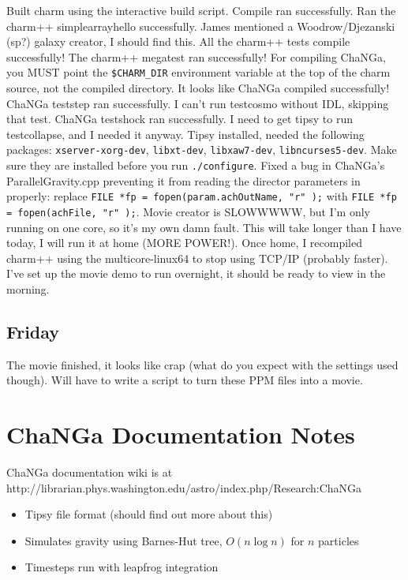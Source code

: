\documentclass[11pt,letterpaper]{article}
\begin{document}
Built charm using the interactive build script. Compile ran
successfully. Ran the charm++ simplearrayhello successfully. James
mentioned a Woodrow/Djezanski (sp?) galaxy creator, I should find this.
All the charm++ tests compile successfully! The charm++ megatest ran
successfully! For compiling ChaNGa, you MUST point the \verb!$CHARM_DIR!
environment variable at the top of the charm source, not the compiled
directory. It looks like ChaNGa compiled successfully! ChaNGa teststep
ran successfully. I can't run testcosmo without IDL, skipping that test.
ChaNGa testshock ran successfully. I need to get tipsy to run
testcollapse, and I needed it anyway. Tipsy installed, needed the
following packages: \verb!xserver-xorg-dev!, \verb!libxt-dev!,
\verb!libxaw7-dev!, \verb!libncurses5-dev!. Make sure they are installed
before you run \verb!./configure!. Fixed a bug in ChaNGa's
ParallelGravity.cpp preventing it from reading the director parameters
in properly: replace \verb!FILE *fp = fopen(param.achOutName, "r" );!
with \verb!FILE *fp = fopen(achFile, "r" );!. Movie creator is SLOWWWWW,
but I'm only running on one core, so it's my own damn fault. This will
take longer than I have today, I will run it at home (MORE POWER!). Once
home, I recompiled charm++ using the multicore-linux64 to stop using
TCP/IP (probably faster).\\I've set up the movie demo to run overnight,
it should be ready to view in the morning.

\subsection{Friday}

The movie finished, it looks like crap (what do you expect with the
settings used though). Will have to write a script to turn these PPM
files into a movie.

\section{ChaNGa Documentation Notes}

ChaNGa documentation wiki is at
http://librarian.phys.washington.edu/astro/index.php/Research:ChaNGa

\begin{itemize}
\item
  Tipsy file format (should find out more about this)
\item
  Simulates gravity using Barnes-Hut tree, $O(n\log n)$ for $n$
  particles
\item
  Timesteps run with leapfrog integration
\end{itemize}
\end{document}

